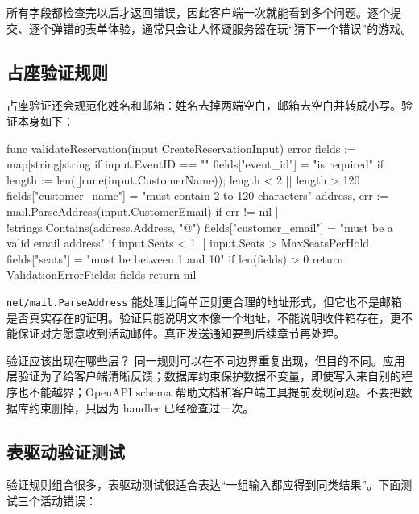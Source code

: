 所有字段都检查完以后才返回错误，因此客户端一次就能看到多个问题。逐个提交、逐个弹错的表单体验，通常只会让人怀疑服务器在玩“猜下一个错误”的游戏。

\subsection{占座验证规则}

占座验证还会规范化姓名和邮箱：姓名去掉两端空白，邮箱去空白并转成小写。验证本身如下：

\begin{gocode}[title={代码清单 12.14 \texttt{service.go}：验证占座输入}]
func validateReservation(input CreateReservationInput) error {
    fields := map[string]string{}
    if input.EventID == "" {
        fields["event_id"] = "is required"
    }
    if length := len([]rune(input.CustomerName));
        length < 2 || length > 120 {
        fields["customer_name"] = "must contain 2 to 120 characters"
    }
    address, err := mail.ParseAddress(input.CustomerEmail)
    if err != nil || !strings.Contains(address.Address, "@") {
        fields["customer_email"] = "must be a valid email address"
    }
    if input.Seats < 1 || input.Seats > MaxSeatsPerHold {
        fields["seats"] = "must be between 1 and 10"
    }
    if len(fields) > 0 {
        return ValidationError{Fields: fields}
    }
    return nil
}
\end{gocode}

\texttt{net/mail.ParseAddress} 能处理比简单正则更合理的地址形式，但它也不是邮箱是否真实存在的证明。验证只能说明文本像一个地址，不能说明收件箱存在，更不能保证对方愿意收到活动邮件。真正发送通知要到后续章节再处理。

\begin{infobox}{验证应该出现在哪些层？}
同一规则可以在不同边界重复出现，但目的不同。应用层验证为了给客户端清晰反馈；数据库约束保护数据不变量，即使写入来自别的程序也不能越界；OpenAPI schema 帮助文档和客户端工具提前发现问题。不要把数据库约束删掉，只因为 handler 已经检查过一次。
\end{infobox}

\subsection{表驱动验证测试}

验证规则组合很多，表驱动测试很适合表达“一组输入都应得到同类结果”。下面测试三个活动错误：


